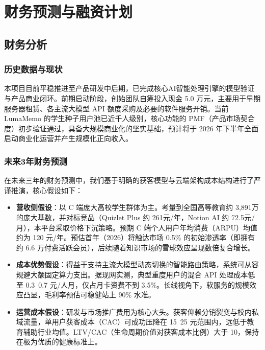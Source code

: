 
\chapter{财务预测与融资计划}

\section{财务分析}

\subsection{历史数据与现状}
本项目目前平稳推进至产品研发中后期，已完成核心AI智能处理引擎的模型验证与产品商业闭环。前期启动阶段，创始团队自筹投入现金 5.0 万元，主要用于早期服务器租赁、各主流大模型 API 额度采购及必要的软件服务开销。当前 LumaMemo 的学生种子用户池已近千人级别，核心功能的 PMF（产品市场契合度）初步验证通过，具备大规模商业化的坚实基础，预计将于 2026 年下半年全面启动商业化运营并产生规模化正向收入。

\subsection{未来3年财务预测}
在未来三年的财务预测中，我们基于明确的获客模型与云端架构成本结构进行了严谨推演，核心假设如下：
\begin{itemize}
    \item \textbf{营收侧假设}：以 C 端庞大高校学生群体为主。考量到全国高等教育约 3,891万 的庞大基数，并对标竞品（Quizlet Plus 约 261元/年，Notion AI 约 72.5元/月），本平台采取价格下沉策略。预期 C 端个人用户年均消费（ARPU）均值约为 120 元/年。预估首年（2026）将触达市场 0.5\% 的初始渗透率（即拥有约 6.6 万付费活跃会员），后续随着知识市场的雪球效应呈现数倍复合增长。
    \item \textbf{成本优势假设}：得益于支持主流大模型动态切换的智能路由策略，系统可从容规避大额固定算力支出。据现网实测，典型重度用户的混合 API 处理成本低至 0.3~0.7 元/人月，仅占月卡资费不到 3.5\%。长线视角下，软服务的规模效应凸显，毛利率预估可稳健站上 90\% 水准。
    \item \textbf{运营成本假设}：研发与市场推广费用为核心大头。获客仰赖分销裂变与校内私域流量，单用户获客成本（CAC）可成功压降在 15~25 元范围内，远低于教育辅助行业均值。LTV/CAC（生命周期价值对获客成本比例）大于 10，保持在极为优质的健康标准上。
\end{itemize}

